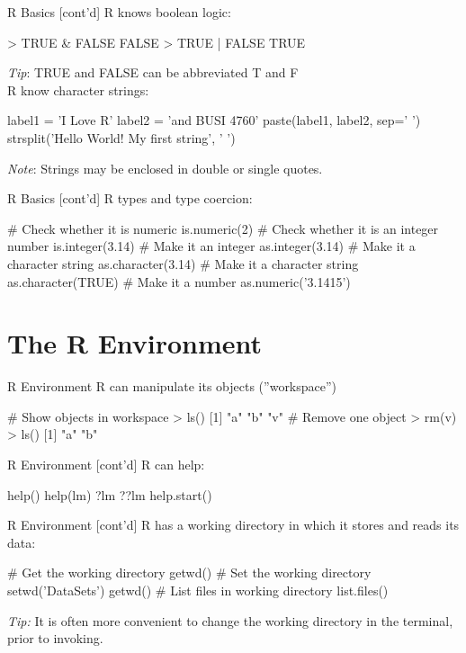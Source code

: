 \documentclass[ignorenonframetext,xcolor=x11names]{beamer}
\begin{document}
\begin{frame}[label=full,fragile]{R Basics \small [cont'd]}
R knows boolean logic:
\begin{Rcode}
> TRUE & FALSE
FALSE
> TRUE | FALSE
TRUE
\end{Rcode}

\emph{Tip}: TRUE and FALSE can be abbreviated T and F \\

R know character strings:
\begin{Rcode}
label1 = 'I Love R'
label2 = 'and BUSI 4760'
paste(label1, label2, sep=' ')
strsplit('Hello World! My first string', ' ')
\end{Rcode}
\emph{Note}: Strings may be enclosed in double or single quotes. \\

\end{frame}

\begin{frame}[label=full,fragile]{R Basics \small [cont'd]}
R types and type coercion:
\begin{Rcode}
# Check whether it is numeric
is.numeric(2)
# Check whether it is an integer number
is.integer(3.14)
# Make it an integer
as.integer(3.14)
# Make it a character string
as.character(3.14)
# Make it a character string
as.character(TRUE)
# Make it a number
as.numeric('3.1415')
\end{Rcode}
\end{frame}

\section{The R Environment}

\begin{frame}[label=full,fragile]{R Environment}
R can manipulate its objects (''workspace'')
\begin{Rcode}
# Show objects in workspace
> ls()
[1] "a"          "b"          "v"
# Remove one object
> rm(v)
> ls()
[1] "a"          "b"
\end{Rcode}
\end{frame}


\begin{frame}[label=full,fragile]{R Environment \small [cont'd]}
R can help:
\begin{Rcode}
help()
help(lm)
?lm
??lm
help.start()
\end{Rcode}
\end{frame}

\begin{frame}[label=full,fragile]{R Environment \small [cont'd]}
R has a working directory in which it stores and reads its data:
\begin{Rcode}
# Get the working directory
getwd()
# Set the working directory
setwd('DataSets')
getwd()
# List files in working directory
list.files()
\end{Rcode}

\emph{Tip:} It is often more convenient to change the working directory in the terminal, prior to invoking.

\end{frame}
\end{document}
